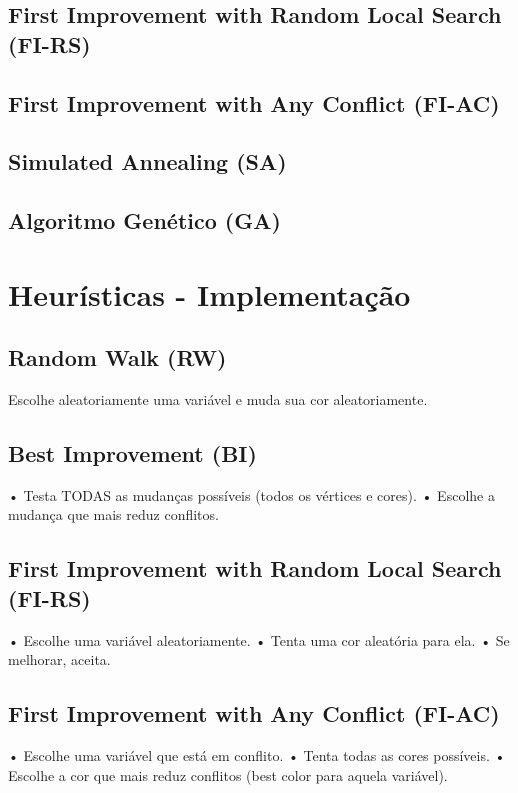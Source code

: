 \documentclass[12pt,a4paper]{article}
\begin{document}
\subsection{First Improvement with Random Local Search (FI-RS)}

\subsection{First Improvement with Any Conflict (FI-AC)}

\subsection{Simulated Annealing (SA)}

\subsection{Algoritmo Genético (GA)}


\section{Heurísticas - Implementação}
\subsection{Random Walk (RW)}
Escolhe aleatoriamente uma variável e muda sua cor aleatoriamente.

\subsection{Best Improvement (BI)}
• Testa TODAS as mudanças possíveis (todos os vértices e cores).
• Escolhe a mudança que mais reduz conflitos.

\subsection{First Improvement with Random Local Search (FI-RS)}
• Escolhe uma variável aleatoriamente.
• Tenta uma cor aleatória para ela.
• Se melhorar, aceita.

\subsection{First Improvement with Any Conflict (FI-AC)}
• Escolhe uma variável que está em conflito.
• Tenta todas as cores possíveis.
• Escolhe a cor que mais reduz conflitos (best color para aquela variável).
\end{document}
